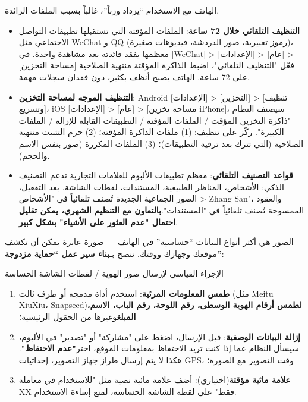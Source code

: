 
الهاتف مع الاستخدام “يزداد وزناً”، غالباً بسبب الملفات الزائدة.

\begin{itemize}
  \item \textbf{التنظيف التلقائي خلال 72 ساعة}: الملفات المؤقتة التي تستقبلها تطبيقات التواصل الاجتماعي مثل WeChat و QQ (رموز تعبيرية، صور الدردشة، فيديوهات صغيرة)، معظمها يفقد فائدته بعد مشاهدة واحدة. في [WeChat] > [الإعدادات] > [عام] > [مساحة التخزين] فعّل "التنظيف التلقائي"، اضبط الذاكرة المؤقتة منتهية الصلاحية على 72 ساعة. الهاتف يصبح أنظف بكثير، دون فقدان سجلات مهمة.
  \item \textbf{التنظيف الموجه لمساحة التخزين}: Android [الإعدادات] > [التخزين] > [تنظيف وتسريع]، iOS [الإعدادات] > [عام] > [مساحة تخزين iPhone]، سيصنف النظام "ذاكرة التخزين المؤقت / الملفات المؤقتة / التطبيقات القابلة للإزالة / الملفات الكبيرة". ركّز على تنظيف: (1) ملفات الذاكرة المؤقتة؛ (2) حزم التثبيت منتهية الصلاحية (التي تترك بعد ترقية التطبيقات)؛ (3) الملفات المكررة (صور بنفس الاسم والحجم).
  \item \textbf{قواعد التصنيف التلقائي}: معظم تطبيقات الألبوم للعلامات التجارية تدعم التصنيف الذكي: الأشخاص، المناظر الطبيعية، المستندات، لقطات الشاشة. بعد التفعيل، الصور الجماعية الجديدة تُصنف تلقائياً في "الأشخاص > Zhang San"، والعقود الممسوحة تُصنف تلقائياً في "المستندات".\textbf{بالتعاون مع التنظيم الشهري، يمكن تقليل احتمال "عدم العثور على الأشياء" بشكل كبير}.
\end{itemize}


الصور هي أكثر أنواع البيانات “حساسية” في الهاتف — صورة عابرة يمكن أن تكشف موقعك وجهازك ووقتك. ننصح بـ\textbf{بناء سير عمل “حماية مزدوجة”}:

\begin{tcbwarn}{الإجراء القياسي لإرسال صور الهوية / لقطات الشاشة الحساسة}
\begin{enumerate}
  \item \textbf{طمس المعلومات المرئية}: استخدم أداة مدمجة أو طرف ثالث (مثل Meitu XiuXiu، Snapseed)\textbf{لطمس أرقام الهوية الوسطى، رقم اللوحة، رقم الباب، الاسم، المبلغ}وغيرها من الحقول الرئيسية؛
  \item \textbf{إزالة البيانات الوصفية}: قبل الإرسال، اضغط على "مشاركة" أو "تصدير" في الألبوم، سيسأل النظام عما إذا كنت تريد الاحتفاظ بمعلومات الموقع، اختر\textbf{"عدم الاحتفاظ"}. هكذا لا يتم إرسال طراز جهاز التصوير، إحداثيات GPS، وقت التصوير مع الصورة؛
  \item \textbf{علامة مائية مؤقتة}(اختياري): أضف علامة مائية نصية مثل "للاستخدام في معاملة XX فقط" على لقطة الشاشة الحساسة، لمنع إساءة الاستخدام.
\end{enumerate}

\end{tcbwarn}

